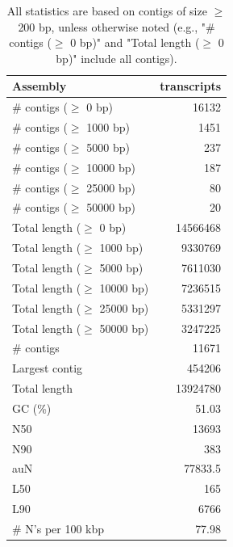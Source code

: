 \documentclass[12pt,a4paper]{article}
\begin{document}
\begin{table}[ht]
\begin{center}
\caption{All statistics are based on contigs of size $\geq$ 200 bp, unless otherwise noted (e.g., "\# contigs ($\geq$ 0 bp)" and "Total length ($\geq$ 0 bp)" include all contigs).}
\begin{tabular}{|l*{1}{|r}|}
\hline
Assembly & transcripts \\ \hline
\# contigs ($\geq$ 0 bp) & 16132 \\ \hline
\# contigs ($\geq$ 1000 bp) & 1451 \\ \hline
\# contigs ($\geq$ 5000 bp) & 237 \\ \hline
\# contigs ($\geq$ 10000 bp) & 187 \\ \hline
\# contigs ($\geq$ 25000 bp) & 80 \\ \hline
\# contigs ($\geq$ 50000 bp) & 20 \\ \hline
Total length ($\geq$ 0 bp) & 14566468 \\ \hline
Total length ($\geq$ 1000 bp) & 9330769 \\ \hline
Total length ($\geq$ 5000 bp) & 7611030 \\ \hline
Total length ($\geq$ 10000 bp) & 7236515 \\ \hline
Total length ($\geq$ 25000 bp) & 5331297 \\ \hline
Total length ($\geq$ 50000 bp) & 3247225 \\ \hline
\# contigs & 11671 \\ \hline
Largest contig & 454206 \\ \hline
Total length & 13924780 \\ \hline
GC (\%) & 51.03 \\ \hline
N50 & 13693 \\ \hline
N90 & 383 \\ \hline
auN & 77833.5 \\ \hline
L50 & 165 \\ \hline
L90 & 6766 \\ \hline
\# N's per 100 kbp & 77.98 \\ \hline
\end{tabular}
\end{center}
\end{table}
\end{document}
